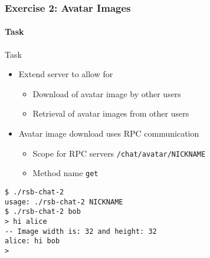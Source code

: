 \documentclass[8pt, presentation]{beamer}
\begin{document}
\begin{frame}
\frametitle{Exercise 2: Avatar Images}
\framesubtitle{Task}
\label{sec-3}
\begin{block}{Task}
\label{sec-3-1}

\begin{itemize}
\item Extend server to allow for
\begin{itemize}
\item Download of avatar image by other users
\item Retrieval of avatar images from other users
\end{itemize}
\item Avatar image download uses RPC communication
\begin{itemize}
\item Scope for RPC servers \texttt{/chat/avatar/NICKNAME}
\item Method name \texttt{get}
\end{itemize}
\end{itemize}
\end{block}
\begin{example}[Example]
\label{sec-3-2}


\begin{verbatim}
$ ./rsb-chat-2
usage: ./rsb-chat-2 NICKNAME
$ ./rsb-chat-2 bob
> hi alice
-- Image width is: 32 and height: 32
alice: hi bob
>
\end{verbatim}
\end{example}
\end{frame}
\end{document}
